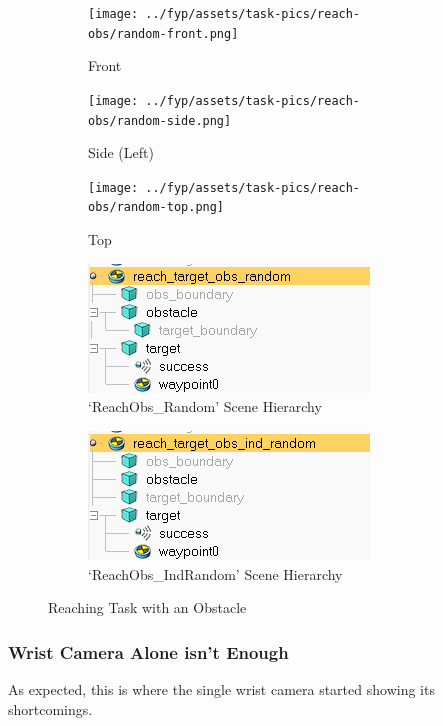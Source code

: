 \begin{figure}[htpb] %
  \centering
  \begin{subfigure}{0.3\linewidth}
    \centering
    \texttt{[image: ../fyp/assets/task-pics/reach-obs/random-front.png]}
    \caption{Front}
  \end{subfigure}
  \hfill
  \begin{subfigure}{0.3\linewidth}
    \centering
    \texttt{[image: ../fyp/assets/task-pics/reach-obs/random-side.png]}
    \caption{Side (Left)}
  \end{subfigure}
  \hfill
  \begin{subfigure}{0.3\linewidth}
    \centering
    \texttt{[image: ../fyp/assets/task-pics/reach-obs/random-top.png]}
    \caption{Top}
  \end{subfigure}
  \vfill
  \begin{subfigure}{0.45\linewidth}
    \centering
    \includegraphics[scale=0.5]{assets/early-work/obs-random-scene-hierarchy.png}
    \caption{`ReachObs\_Random' Scene Hierarchy}
  \end{subfigure}
  \hfill
  \begin{subfigure}{0.45\linewidth}
    \centering
    \includegraphics[scale=0.5]{assets/early-work/obs-ind-random-scene-hierarchy.png}
    \caption{`ReachObs\_IndRandom' Scene Hierarchy}
  \end{subfigure}
  \caption{Reaching Task with an Obstacle}\label{fig:reach-obs-random}
\end{figure}


\subsubsection{Wrist Camera Alone isn't Enough}

As expected, this is where the single wrist camera started showing its shortcomings. 

